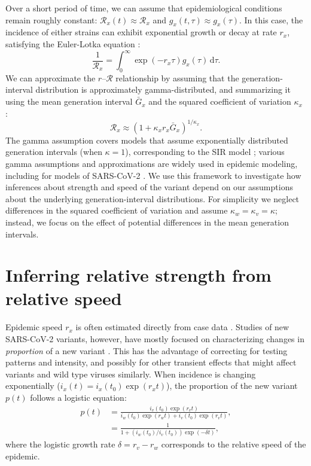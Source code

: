 \documentclass[12pt]{article}
\newcommand{\RR}{\ensuremath{{\mathcal R}}\xspace}
\newcommand{\dd}[1]{\ensuremath{\, \mathrm{d}#1}}
\newcommand{\dtau}{\dd{\tau}}
\begin{document}
Over a short period of time, we can assume that epidemiological conditions remain roughly constant: $\RR_x(t) \approx \RR_x$ and $g_x(t, \tau) \approx g_x(\tau)$.
In this case, the incidence of either strains can exhibit exponential growth or decay at rate $r_x$, satisfying the Euler-Lotka equation \citep{wallinga2007generation}:
\begin{equation}
\frac{1}{\RR_x} = \int_0^\infty \exp(- r_x \tau) g_x(\tau) \dtau.
\end{equation}
We can approximate the $r$--$\RR$ relationship by assuming that the generation-interval distribution is approximately gamma-distributed, and summarizing it using the mean generation interval $\bar{G}_x$ and the squared coefficient of variation $\kappa_x$ \citep{park2019practical}:
\begin{equation}
\RR_x \approx (1 + \kappa_x r_x \bar{G}_x)^{1/\kappa_x}.
\end{equation}
The gamma assumption covers models that assume exponentially distributed generation intervals (when $\kappa=1$), corresponding to the SIR model \citep{anderson1991infectious}; various gamma assumptions and approximations are widely used in epidemic modeling, including for models of SARS-CoV-2 \citep{doi:10.1098/rsif.2020.0144}.
We use this framework to investigate how inferences about strength and speed of the variant depend on our assumptions about the underlying generation-interval distributions.
For simplicity we neglect differences in the squared coefficient of variation and assume $\kappa_w = \kappa_v = \kappa$; instead, we focus on the effect of potential differences in the mean generation intervals.

\section{Inferring relative strength from relative speed}

Epidemic speed $r_x$ is often estimated directly from case data \citep{mills2004transmissibility,nishiura2009transmission,ma2014estimating}.
Studies of new SARS-CoV-2 variants, however, have mostly focused on characterizing changes in \emph{proportion} of a new variant \citep{switzerland2021variant, davies2021estimated, di2021impact, leung2021early, volz2021transmission,zhao2021}.
This has the advantage of correcting for testing patterns and intensity, and possibly for other transient effects that might affect variants and wild type viruses similarly.
When incidence is changing exponentially ($i_x(t) = i_x(t_0) \exp(r_x t)$), the proportion of the new variant $p(t)$ follows a logistic equation:
\begin{align}
p(t) &= \frac{i_v(t_0) \exp(r_v t)}{i_w(t_0) \exp(r_w t) + i_v(t_0) \exp(r_v t)},
\\ &= \frac{1}{1 + \left(i_w(t_0)/i_v(t_0)\right) \exp(-\delta t)},
\end{align}
where the logistic growth rate $\delta = r_v - r_w$ corresponds to the relative speed of the epidemic.
\end{document}
